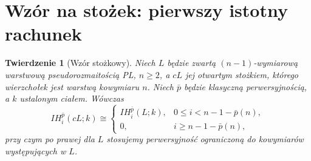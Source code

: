 \documentclass[11pt,a4paper,oneside]{report}
\theoremstyle{plain}
\newtheorem{twierdzenie}{Twierdzenie}[section]
\theoremstyle{definition}
\theoremstyle{remark}
\begin{document}
\section{Wzór na stożek: pierwszy istotny rachunek}
\begin{twierdzenie}[Wzór stożkowy]
\label{thm:cone-ih-xiii}
Niech $L$ będzie zwartą $(n-1)$-wymiarową
warstwową pseudorozmaitością PL, $n\ge2$, a $cL$
jej otwartym stożkiem, którego wierzchołek jest
warstwą kowymiaru $n$. Niech $\bar p$ będzie klasyczną
perwersyjnością, a $k$ ustalonym ciałem. Wówczas
\[
IH_i^{\bar p}(cL;k)\cong
\begin{cases}
IH_i^{\bar p}(L;k),&0\le i<n-1-\bar p(n),\\
0,&i\ge n-1-\bar p(n),
\end{cases}
\]
przy czym po prawej dla $L$ stosujemy perwersyjność
ograniczoną do kowymiarów występujących w $L$.
\end{twierdzenie}
\end{document}

